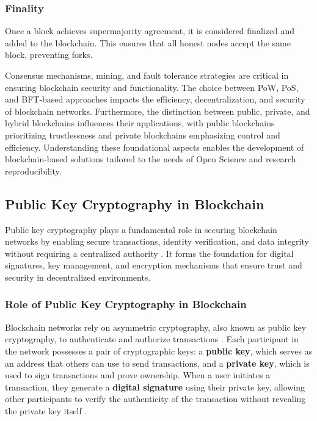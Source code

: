 \documentclass[final]{rc-book-2.14}
\begin{document}
\subsubsection{Finality}
Once a block achieves supermajority agreement, it is considered finalized and added to the blockchain. This ensures that all honest nodes accept the same block, preventing forks.

Consensus mechanisms, mining, and fault tolerance strategies are critical in ensuring blockchain security and functionality. The choice between PoW, PoS, and BFT-based approaches impacts the efficiency, decentralization, and security of blockchain networks. Furthermore, the distinction between public, private, and hybrid blockchains influences their applications, with public blockchains prioritizing trustlessness and private blockchains emphasizing control and efficiency. Understanding these foundational aspects enables the development of blockchain-based solutions tailored to the needs of Open Science and research reproducibility.


\subsection{Public Key Cryptography in Blockchain}

Public key cryptography plays a fundamental role in securing blockchain networks by enabling secure transactions, identity verification, and data integrity without requiring a centralized authority \cite{narayanan2016bitcoin}. It forms the foundation for digital signatures, key management, and encryption mechanisms that ensure trust and security in decentralized environments.

\subsubsection{Role of Public Key Cryptography in Blockchain}
Blockchain networks rely on asymmetric cryptography, also known as public key cryptography, to authenticate and authorize transactions \cite{rivest1978method}. Each participant in the network possesses a pair of cryptographic keys: a \textbf{public key}, which serves as an address that others can use to send transactions, and a \textbf{private key}, which is used to sign transactions and prove ownership. When a user initiates a transaction, they generate a \textbf{digital signature} using their private key, allowing other participants to verify the authenticity of the transaction without revealing the private key itself \cite{menezes1996handbook}.
\end{document}

